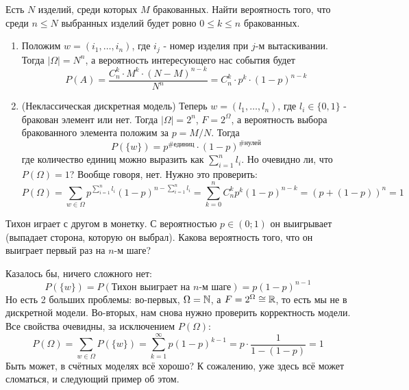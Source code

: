 \begin{itemize}
\begin{enumerate}
		\begin{example}
			Есть $N$ изделий, среди которых $M$ бракованных. Найти вероятность того, что среди $n \le N$ выбранных изделий будет ровно $0 \le k \le n$ бракованных.
		
			\begin{enumerate}
				\item Положим $w = (i_1, \ldots, i_n)$, где $i_j$ - номер изделия при $j$-м вытаскивании. Тогда $|\Omega| = N^n$, а вероятность интересующего нас события будет
				\[
					P(A) = \frac{C_n^k \cdot M^k \cdot (N - M)^{n - k}}{N^n} = C_n^k \cdot p^k \cdot (1 - p)^{n - k}
				\]
				
				\item (Неклассическая дискретная модель) Теперь $w = (l_1, \ldots, l_n)$, где $l_i \in \{0, 1\}$ - бракован элемент или нет. Тогда $|\Omega| = 2^n$, $F = 2^\Omega$, а вероятность выбора бракованного элемента положим за $p = M / N$. Тогда
				\[
					P(\{w\}) = p^{\text{\#единиц}} \cdot (1 - p)^{\text{\#нулей}}
				\]
				где количество единиц можно выразить как $\sum_{i = 1}^n l_i$. Но очевидно ли, что $P(\Omega) = 1$? Вообще говоря, нет. Нужно это проверить:
				\[
					P(\Omega) = \sum_{w \in \Omega} p^{\sum_{i = 1}^n l_i} (1 - p)^{n - \sum_{i = 1}^n l_i} = \sum_{k = 0}^n C_n^k p^k (1 - p)^{n - k} = (p + (1 - p))^n = 1
				\]
			\end{enumerate}
		\end{example}
	
		\begin{example}
			Тихон играет с другом в монетку. С вероятностью $p \in (0; 1)$ он выигрывает (выпадает сторона, которую он выбрал). Какова вероятность того, что он выиграет первый раз на $n$-м шаге?
			
			Казалось бы, ничего сложного нет:
			\[
				P(\{w\}) = P(\text{Тихон выиграет на $n$-м шаге}) = p(1 - p)^{n - 1}
			\]
			Но есть 2 больших проблемы: во-первых, $\Omega = \mathbb{N}$, а $F = 2^\Omega \cong \mathbb{R}$, то есть мы не в дискретной модели. Во-вторых, нам снова нужно проверить корректность модели. Все свойства очевидны, за исключением $P(\Omega)$:
			\[
				P(\Omega) = \sum_{w \in \Omega} P(\{w\}) = \sum_{k = 1}^\infty p(1 - p)^{k - 1} = p \cdot \frac{1}{1 - (1 - p)} = 1
			\]
			Быть может, в счётных моделях всё хорошо? К сожалению, уже здесь всё может сломаться, и следующий пример об этом.
		\end{example}
	

\end{enumerate}
\end{itemize}
